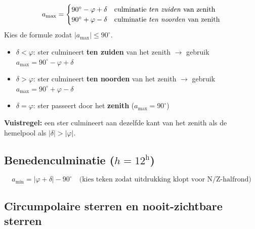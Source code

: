 \documentclass[11pt, a4paper]{article}
\newcommand{\graden}{^{\circ}}
\begin{document}
\begin{formule}
\[
  a_\mathrm{max} =
  \begin{cases}
    90\graden - \varphi + \delta & \text{culminatie \emph{ten zuiden} van zenith} \\
    90\graden + \varphi - \delta & \text{culminatie \emph{ten noorden} van zenith}
  \end{cases}
\]
Kies de formule zodat $|a_\mathrm{max}| \leq 90\graden$.
\end{formule}

\begin{weetje}
\begin{itemize}[leftmargin=1.5em]
  \item $\delta < \varphi$: ster culmineert \textbf{ten zuiden} van het zenith
    $\to$ gebruik $a_\mathrm{max} = 90\graden - \varphi + \delta$
  \item $\delta > \varphi$: ster culmineert \textbf{ten noorden} van het zenith
    $\to$ gebruik $a_\mathrm{max} = 90\graden + \varphi - \delta$
  \item $\delta = \varphi$: ster passeert door het \textbf{zenith} ($a_\mathrm{max} = 90\graden$)
\end{itemize}
\textbf{Vuistregel:} een ster culmineert aan dezelfde kant van het zenith als de hemelpool als $|\delta| > |\varphi|$.
\end{weetje}

\subsection{Benedenculminatie ($h = 12^\mathrm{h}$)}

\begin{formule}
\[
  a_\mathrm{min} = |\varphi + \delta| - 90\graden
  \quad \text{(kies teken zodat uitdrukking klopt voor N/Z-halfrond)}
\]
\end{formule}

\subsection{Circumpolaire sterren en nooit-zichtbare sterren}
\end{document}
